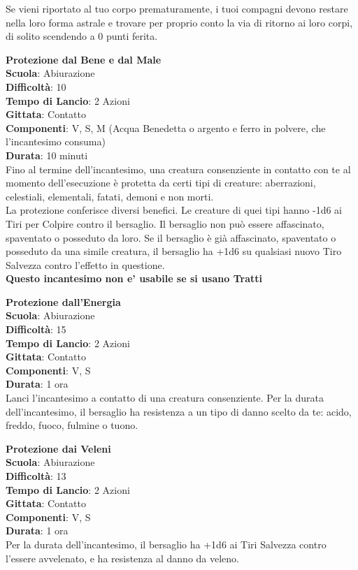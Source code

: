 \begin{multicols}{2}
Se vieni riportato al tuo corpo prematuramente, i tuoi compagni devono restare nella loro forma astrale e trovare per proprio conto la via di ritorno ai loro corpi, di solito scendendo a 0 punti ferita.

\medskip\textbf{Protezione dal Bene e dal Male}\\
\textbf{Scuola}: Abiurazione\\
\textbf{Difficoltà}:  10\\
\textbf{Tempo di Lancio}: 2 Azioni\\
\textbf{Gittata}: Contatto\\
\textbf{Componenti}: V, S, M (Acqua Benedetta o argento e ferro in polvere, che l'incantesimo consuma)\\
\textbf{Durata}: 10 minuti\\
Fino al termine dell'incantesimo, una creatura consenziente in contatto con te al momento dell'esecuzione è protetta da certi tipi di creature: aberrazioni, celestiali, elementali, fatati, demoni e non morti.\\
La protezione conferisce diversi benefici. Le creature di quei tipi hanno -1d6 ai Tiri per Colpire contro il bersaglio. Il bersaglio non può essere affascinato, spaventato o posseduto da loro. Se il bersaglio è già affascinato, spaventato o posseduto da una simile creatura, il bersaglio ha +1d6 su qualsiasi nuovo Tiro Salvezza contro l’effetto in questione.\\
\textbf{Questo incantesimo non e' usabile se si usano  Tratti}

\medskip\textbf{Protezione dall'Energia}\\
\textbf{Scuola}: Abiurazione\\
\textbf{Difficoltà}:  15\\
\textbf{Tempo di Lancio}: 2 Azioni\\
\textbf{Gittata}: Contatto\\
\textbf{Componenti}: V, S\\
\textbf{Durata}: 1 ora\\
Lanci l'incantesimo a contatto di una creatura consenziente. Per la durata dell'incantesimo, il bersaglio ha resistenza a un tipo di danno scelto da te: acido, freddo, fuoco, fulmine o tuono.

\medskip\textbf{Protezione dai Veleni}\\
\textbf{Scuola}: Abiurazione\\
\textbf{Difficoltà}:  13\\
\textbf{Tempo di Lancio}: 2 Azioni\\
\textbf{Gittata}: Contatto\\
\textbf{Componenti}: V, S\\
\textbf{Durata}: 1 ora\\
Per la durata dell'incantesimo, il bersaglio ha +1d6 ai Tiri Salvezza contro l’essere avvelenato, e ha resistenza al danno da veleno.


\end{multicols}
